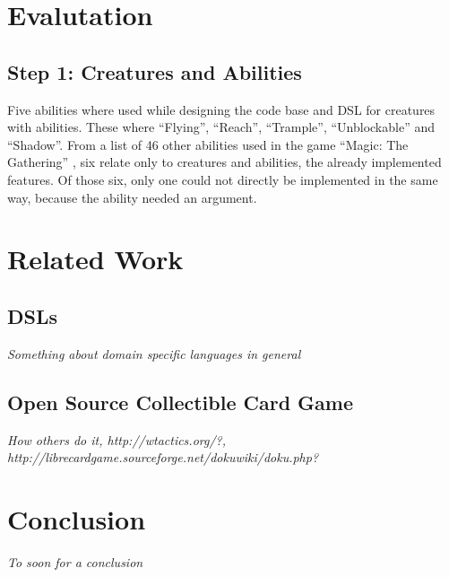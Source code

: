 \documentclass[twocolumn]{phdsymp}
\begin{document}
\section{Evalutation}
\subsection*{Step 1: Creatures and Abilities}
Five abilities where used while designing the code base and DSL for creatures with abilities. These where ``Flying'', ``Reach'', ``Trample'', ``Unblockable'' and ``Shadow''. From a list of 46 other abilities used in the game ``Magic: The Gathering'' \cite{List of abilities}, six relate only to creatures and abilities, the already implemented features. Of those six, only one could not directly be implemented in the same way, because the ability needed an argument.

\section{Related Work}
\subsection{DSLs}
\textit{Something about domain specific languages in general}

\subsection{Open Source Collectible Card Game}
\textit{How others do it, http://wtactics.org/?, http://librecardgame.sourceforge.net/dokuwiki/doku.php?}

\section{Conclusion}
\textit{To soon for a conclusion}
\end{document}

